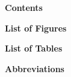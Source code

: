 \documentclass[12pt,a4paper,oneside]{report}
\theoremstyle{definition}
\theoremstyle{remark}
\begin{document}
\makeatletter
\renewcommand{\tableofcontents}{%
  \chapter*{\contentsname}%
  \@starttoc{toc}%
}
\renewcommand{\listoffigures}{%
  \chapter*{\listfigurename}%
  \@starttoc{lof}%
}
\renewcommand{\listoftables}{%
  \chapter*{\listtablename}%
  \@starttoc{lot}%
}
\renewcommand{\@makeschapterhead}[1]{%
  \vspace*{0pt}%
  {\centering\bfseries\Large #1\par}%
  \vspace{12mm}%
}
\makeatother

\makeatletter

\begin{center}
\textbf{\Large Contents}
\end{center}
\vspace{12mm}
\newpage

\begin{center}
\textbf{\Large List of Figures}
\end{center}
\vspace{12mm}
\newpage

\begin{center}
\textbf{\Large List of Tables}
\end{center}
\vspace{12mm}
\newpage

\makeatother

\renewcommand{\arraystretch}{2}
\begin{center}
\textbf{\Large Abbreviations}
\end{center}
\end{document}
